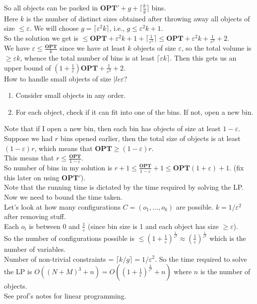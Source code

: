 \documentclass[a4paper]{article}
\newcommand{\nl}{\vspace{0.2cm}\\}
\newcommand{\eps}{\varepsilon}
\newcommand{\OPT}{\mathbf{OPT}}
\begin{document}
So all objects can be packed in $\OPT' + g + \lceil \frac{k}{g} \rceil$ bins.\nl
Here $k$ is the number of distinct sizes obtained after throwing away all objects of size $\le \eps$.
We will choose $g = \lceil \eps^2 k \rceil$, i.e., $g \le \eps^2 k + 1$.\nl
So the solution we get is $\le \OPT + \eps^2 k + 1 + \lceil\frac{1}{\eps^2}\rceil \le \OPT + \eps^2 k + \frac{1}{\eps^2} + 2$.\nl
We have $\eps \le \frac{\OPT}{k}$ since we have at least $k$ objects of size $\eps$, so the total volume is $\ge \eps k$, whence the total number of bins is at least $\lceil \eps k \rceil$. Then this gets us an upper bound of
$\left(1 + \frac{1}{\eps}\right)\OPT + \frac{1}{\eps^2} + 2$.\nl
How to handle small objects of size $|le \eps$?\nl
\begin{enumerate}
    \item Consider small objects in any order.
    \item For each object, check if it can fit into one of the bins. If not, open a new bin.
\end{enumerate}
Note that if I open a new bin, then each bin has objects of size at least $1 - \eps$. Suppose we had $r$ bins opened earlier, then the total size of objects is at least $(1 - \eps)r$, which
means that $\OPT \ge (1 - \eps) r$.\nl
This means that $r \le \frac{\OPT}{1 - \eps}$.\nl
So number of bins in my solution is $r + 1 \le \frac{\OPT}{1 - \eps} + 1 \le \OPT(1 + \eps) + 1$. (fix this later on using $\OPT'$).\nl
Note that the running time is dictated by the time required by solving the LP.\nl
Now we need to bound the time taken.\nl
Let's look at how many configurations $C = (o_1, \ldots, o_k)$ are possible. $k = 1/\eps^2$ after removing stuff.\nl
Each $o_i$ is between $0$ and $\frac{1}{\eps}$ (since bin size is 1 and each object has size $\ge \eps$).\nl
So the number of configurations possible is $\le \left(1 + \frac{1}{\eps}\right)^{\frac{1}{\eps^2}} \approx
\left(\frac{1}{\eps}\right)^{\frac{1}{\eps^2}}$ which is the number of variables.\nl
Number of non-trivial constraints = $\lceil k/g \rceil = 1/\eps^2$.
So the time required to solve the LP is $O((N + M)^3 + n) = O(\left(1 + \frac{1}{\eps}\right)^{\frac{3}{\eps^2}} + n)$ where $n$ is the number of objects.\nl
See prof's notes for linear programming.
\end{document}
